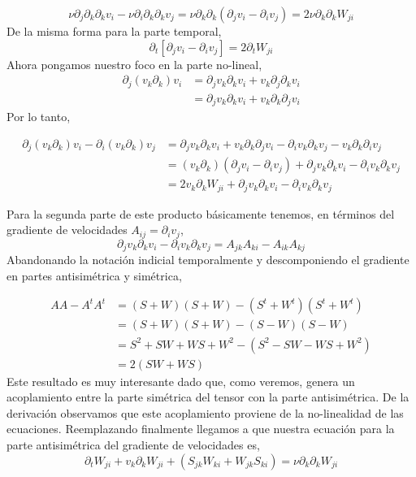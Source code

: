\documentclass[executivepaper,12pt]{article}
\numberwithin{equation}{section}
\begin{document}
\begin{equation*}
	\nu\partial_j\partial_k\partial_k v_i-\nu\partial_i\partial_k\partial_k v_j=\nu\partial_k\partial_k \left(\partial_jv_i-\partial_iv_j\right)=2\nu\partial_k\partial_k W_{ji}
\end{equation*}
De la misma forma para la parte temporal,
\begin{equation*}
	\partial_t\left[\partial_j v_i-\partial_i v_j\right]=2\partial_tW_{ji}
\end{equation*}
Ahora pongamos nuestro foco en la parte no-lineal,
\begin{align*}
	\partial_j(v_k\partial_k)v_i&=\partial_jv_k\partial_kv_i+v_k\partial_j\partial_k v_i\\
	&=\partial_jv_k\partial_kv_i+v_k\partial_k\partial_jv_i
\end{align*}
Por lo tanto, 

\begin{align*}
	\partial_j(v_k\partial_k)v_i-\partial_i(v_k\partial_k)v_j&=\partial_jv_k\partial_kv_i+v_k\partial_k\partial_jv_i-\partial_iv_k\partial_kv_j-v_k\partial_k\partial_iv_j\\
	&=(v_k\partial_k)(\partial_jv_i-\partial_iv_j)+\partial_j v_k \partial_k v_i-\partial_iv_k\partial_kv_j\\
	&=2v_k\partial_kW_{ji}+\partial_j v_k \partial_k v_i-\partial_iv_k\partial_kv_j
\end{align*}

Para la segunda parte de este producto básicamente tenemos, en términos del gradiente de velocidades $A_{ij}=\partial_iv_j$,
\begin{equation*}
	\partial_j v_k \partial_k v_i-\partial_iv_k\partial_kv_j=A_{jk}A_{ki}-A_{ik}A_{kj}
\end{equation*}
Abandonando la notación indicial temporalmente y descomponiendo el gradiente en partes antisimétrica y simétrica,

\begin{align*}
	AA-A^tA^t&=(S+W)(S+W)-(S^t+W^t)(S^t+W^t)\\
	&=(S+W)(S+W)-(S-W)(S-W)\\
	&=S^2+SW+WS+W^2-(S^2-SW-WS+W^2) \\
	&=2(SW+WS)
\end{align*}
 Este resultado es muy interesante dado que, como veremos, genera un acoplamiento entre la parte simétrica del tensor con la parte antisimétrica. De la derivación observamos que este acoplamiento proviene de la no-linealidad de las ecuaciones. Reemplazando finalmente llegamos a que nuestra ecuación para la parte antisimétrica del gradiente de velocidades es,
 \begin{equation*}
 	\partial_tW_{ji}+v_k\partial_kW_{ji}+(S_{jk}W_{ki}+W_{jk}S_{ki})=\nu\partial_k\partial_k W_{ji}
 \end{equation*}
\end{document}

